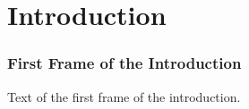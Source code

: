 \section{Introduction}

\begin{frame}
    \frametitle{First Frame of the Introduction}
    
    Text of the first frame of the introduction.

\end{frame}

